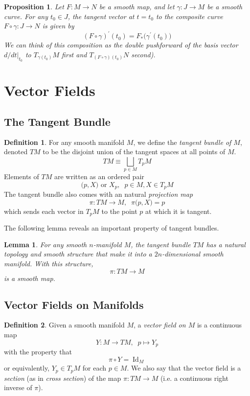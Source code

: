 \documentclass{article}
\DeclareMathOperator{\Id}{Id}
\newtheorem{proposition}[theorem]{Proposition}
\newtheorem{lemma}[theorem]{Lemma}
\theoremstyle{remark}
\theoremstyle{definition}
\newtheorem{definition}{Definition}[section]
\begin{document}
\begin{proposition}
Let $F: M \longrightarrow N$ be a smooth map, and let $\gamma: J \longrightarrow M$ be a smooth curve. For any $t_0 \in J$, the tangent vector at $t = t_0$ to the composite curve $F \circ \gamma: J \longrightarrow N$ is given by 
\[(F \circ \gamma)^\prime (t_0) = F_* \big( \gamma^\prime (t_0) \big)\]
We can think of this composition as the double pushforward of the basis vector $d/dt \big|_{t_0}$ to $T_{\gamma(t_0)} M$ first and $T_{(F \circ \gamma)(t_0)} N$ second). 
\end{proposition}

\section{Vector Fields}
\subsection{The Tangent Bundle}
\begin{definition}
For any smooth manifold $M$, we define the \textit{tangent bundle of $M$}, denoted $TM$ to be the disjoint union of the tangent spaces at all points of $M$. 
\[TM \equiv \bigsqcup_{p \in M} T_p M\]
Elements of $TM$ are written as an ordered pair 
\[\big(p, X \big) \text{ or } X_p, \;\; p \in M, X \in T_p M\]
The tangent bundle also comes with an natural \textit{projection map}
\[\pi: TM \longrightarrow M, \;\; \pi \big(p, X\big) = p\]
which sends each vector in $T_p M$ to the point $p$ at which it is tangent. 
\end{definition}

The following lemma reveals an important property of tangent bundles. 

\begin{lemma}
For any smooth $n$-manifold $M$, the tangent bundle $TM$ has a natural topology and smooth structure that make it into a $2n$-dimensional smooth manifold. With this structure, 
\[\pi: TM \longrightarrow M\]
is a smooth map. 
\end{lemma}

\subsection{Vector Fields on Manifolds}
\begin{definition}
Given a smooth manifold $M$, a \textit{vector field on $M$} is a continuous map 
\[Y: M \longrightarrow TM, \;\; p \mapsto Y_p\]
with the property that 
\[\pi \circ Y = \Id_M\]
or equivalently, $Y_p \in T_p M$ for each $p \in M$. We also say that the vector field is a \textit{section} (as in \textit{cross section}) of the map $\pi: TM \longrightarrow M$ (i.e. a continuous right inverse of $\pi$). 
\end{definition}
\end{document}
